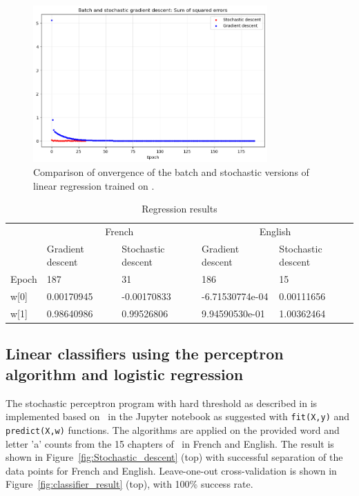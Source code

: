 \documentclass[a4paper]{article}
\begin{document}
\begin{figure}
    \centering
    \includegraphics[width=0.8\textwidth]{figures/Regression errors.png}
    \caption{Comparison of onvergence of the batch and stochastic versions of linear regression trained on \cite{flaubert1862salammbô}.}
    \label{fig:regression_errors}
\end{figure}

\begin{table}[]
    \caption{Regression results}
    \label{tab:regression-table}
    \small
    \begin{tabular}{lllll}
        \hline\hline
             & \multicolumn{2}{c}{French}                    & \multicolumn{2}{c}{English}            \\
             & Gradient descent & Stochastic descent & Gradient descent & Stochastic descent \\
             \hline
    Epoch    & 187              & 31                 & 186              & 15                 \\
    w{[}0{]} & 0.00170945       & -0.00170833        & -6.71530774e-04  & 0.00111656         \\
    w{[}1{]} & 0.98640986       & 0.99526806         & 9.94590530e-01   & 1.00362464\\
    \hline
    \end{tabular}
\end{table}


\subsection{Linear classifiers using the perceptron algorithm and logistic regression}
The stochastic perceptron program with hard threshold as described in \cite[pp. 700--702]{aima} is implemented based on~\cite{nugues_lectures_2025} in the Jupyter notebook as suggested with \verb|fit(X,y)| and \verb|predict(X,w)| functions. The algorithms are applied on the provided word and letter 'a' counts from the 15 chapters of~\cite{flaubert1862salammbô} in French and English. The result is shown in Figure~\ref{fig:Stochastic_descent} (top) with successful separation of the data points for French and English. Leave-one-out cross-validation is shown in Figure~\ref{fig:classifier_result} (top), with 100\% success rate.
\end{document}
